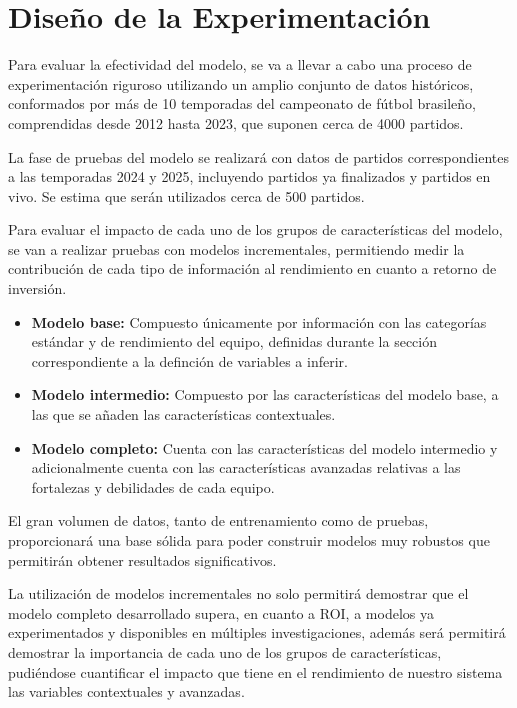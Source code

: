 \section{Diseño de la Experimentación}

Para evaluar la efectividad del modelo, se va a llevar a cabo una proceso de experimentación riguroso utilizando un amplio conjunto de datos históricos, conformados por más de 10 temporadas del campeonato de fútbol brasileño, comprendidas desde 2012 hasta 2023, que suponen cerca de 4000 partidos. 

La fase de pruebas del modelo se realizará con datos de partidos correspondientes a las temporadas 2024 y 2025, incluyendo partidos ya finalizados y partidos en vivo. Se estima que serán utilizados cerca de 500 partidos. 

Para evaluar el impacto de cada uno de los grupos de características del modelo, se van a realizar pruebas con modelos incrementales, permitiendo medir la contribución de cada tipo de información al rendimiento en cuanto a retorno de inversión.

\begin{itemize}
    \item \textbf{Modelo base:} Compuesto únicamente por información con las categorías estándar y de rendimiento del equipo, definidas durante la sección correspondiente a la definción de variables a inferir.
    \item \textbf{Modelo intermedio:} Compuesto por las características del modelo base, a las que se añaden las características contextuales.
    \item \textbf{Modelo completo:} Cuenta con las características del modelo intermedio y adicionalmente cuenta con las características avanzadas relativas a las fortalezas y debilidades de cada equipo.
\end{itemize}


El gran volumen de datos, tanto de entrenamiento como de pruebas, proporcionará una base sólida para poder construir modelos muy robustos que permitirán obtener resultados significativos. 

La utilización de modelos incrementales no solo permitirá demostrar que el modelo completo desarrollado supera, en cuanto a ROI, a modelos ya experimentados y disponibles en múltiples investigaciones, además será permitirá demostrar la importancia de cada uno de los grupos de características, pudiéndose cuantificar el impacto que tiene en el rendimiento de nuestro sistema las variables contextuales y avanzadas.